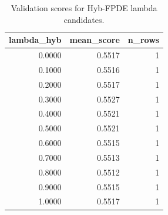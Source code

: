 \begin{table}[t]
\caption{Validation scores for Hyb-FPDE lambda candidates.}
\label{tab:lambda_distribution_computed}
\centering
\begin{tabular}{rrr}
\toprule
lambda\_hyb & mean\_score & n\_rows \\
\midrule
0.0000 & 0.5517 & 1 \\
0.1000 & 0.5516 & 1 \\
0.2000 & 0.5517 & 1 \\
0.3000 & 0.5527 & 1 \\
0.4000 & 0.5521 & 1 \\
0.5000 & 0.5521 & 1 \\
0.6000 & 0.5515 & 1 \\
0.7000 & 0.5513 & 1 \\
0.8000 & 0.5512 & 1 \\
0.9000 & 0.5515 & 1 \\
1.0000 & 0.5517 & 1 \\
\bottomrule
\end{tabular}

\end{table}
